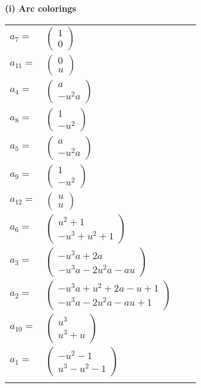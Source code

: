 \documentclass[1p]{elsarticle_modified}
\theoremstyle{definition}
\begin{document}
\flushleft \textbf{(i) Arc colorings}\\
\begin{tabular}{m{7pt} m{180pt} m{7pt} m{180pt} }
\flushright $a_{7}=$&$\begin{pmatrix}1\\0\end{pmatrix}$ \\
\flushright $a_{11}=$&$\begin{pmatrix}0\\u\end{pmatrix}$ \\
\flushright $a_{4}=$&$\begin{pmatrix}a\\- u^2 a\end{pmatrix}$ \\
\flushright $a_{8}=$&$\begin{pmatrix}1\\- u^2\end{pmatrix}$ \\
\flushright $a_{5}=$&$\begin{pmatrix}a\\- u^2 a\end{pmatrix}$ \\
\flushright $a_{9}=$&$\begin{pmatrix}1\\- u^2\end{pmatrix}$ \\
\flushright $a_{12}=$&$\begin{pmatrix}u\\u\end{pmatrix}$ \\
\flushright $a_{6}=$&$\begin{pmatrix}u^2+1\\- u^3+u^2+1\end{pmatrix}$ \\
\flushright $a_{3}=$&$\begin{pmatrix}- u^3 a+2 a\\- u^3 a-2 u^2 a- a u\end{pmatrix}$ \\
\flushright $a_{2}=$&$\begin{pmatrix}- u^3 a+u^2+2 a- u+1\\- u^3 a-2 u^2 a- a u+1\end{pmatrix}$ \\
\flushright $a_{10}=$&$\begin{pmatrix}u^3\\u^3+u\end{pmatrix}$ \\
\flushright $a_{1}=$&$\begin{pmatrix}- u^2-1\\u^3- u^2-1\end{pmatrix}$\\&\end{tabular}
\end{document}
